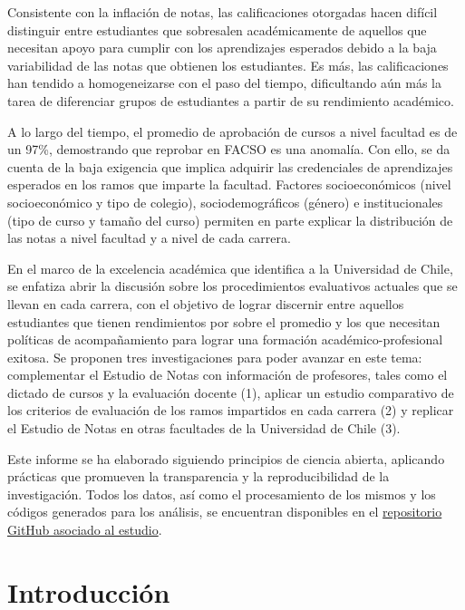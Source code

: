 \documentclass[
  spanish,
  a4paper,
  oneside]{scrbook}
\begin{document}
Consistente con la inflación de notas, las calificaciones otorgadas
hacen difícil distinguir entre estudiantes que sobresalen académicamente
de aquellos que necesitan apoyo para cumplir con los aprendizajes
esperados debido a la baja variabilidad de las notas que obtienen los
estudiantes. Es más, las calificaciones han tendido a homogeneizarse con
el paso del tiempo, dificultando aún más la tarea de diferenciar grupos
de estudiantes a partir de su rendimiento académico.

A lo largo del tiempo, el promedio de aprobación de cursos a nivel
facultad es de un 97\%, demostrando que reprobar en FACSO es una
anomalía. Con ello, se da cuenta de la baja exigencia que implica
adquirir las credenciales de aprendizajes esperados en los ramos que
imparte la facultad. Factores socioeconómicos (nivel socioeconómico y
tipo de colegio), sociodemográficos (género) e institucionales (tipo de
curso y tamaño del curso) permiten en parte explicar la distribución de
las notas a nivel facultad y a nivel de cada carrera.

En el marco de la excelencia académica que identifica a la Universidad
de Chile, se enfatiza abrir la discusión sobre los procedimientos
evaluativos actuales que se llevan en cada carrera, con el objetivo de
lograr discernir entre aquellos estudiantes que tienen rendimientos por
sobre el promedio y los que necesitan políticas de acompañamiento para
lograr una formación académico-profesional exitosa. Se proponen tres
investigaciones para poder avanzar en este tema: complementar el Estudio
de Notas con información de profesores, tales como el dictado de cursos
y la evaluación docente (1), aplicar un estudio comparativo de los
criterios de evaluación de los ramos impartidos en cada carrera (2) y
replicar el Estudio de Notas en otras facultades de la Universidad de
Chile (3).

Este informe se ha elaborado siguiendo principios de ciencia abierta,
aplicando prácticas que promueven la transparencia y la reproducibilidad
de la investigación. Todos los datos, así como el procesamiento de los
mismos y los códigos generados para los análisis, se encuentran
disponibles en el
\href{https://github.com/tomasurzuam/estudio-notas}{repositorio GitHub
asociado al estudio}.


\chapter{Introducción}\label{introducciuxf3n}
\end{document}
